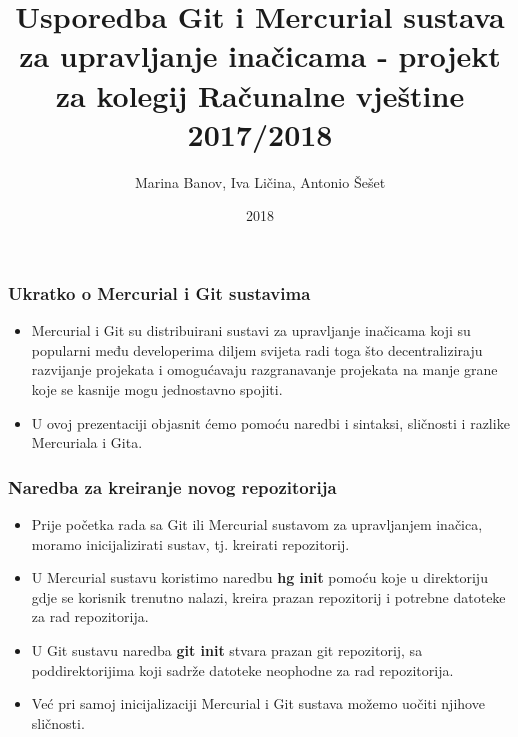 \documentclass{beamer}
\title{Usporedba Git i Mercurial sustava za upravljanje inačicama - projekt za kolegij Računalne vještine 2017/2018}
\author{Marina Banov, Iva Ličina, Antonio Šešet}
\institute{Tehnički fakultet u Rijeci}
\date{2018}
\begin{document}
 
	\frame{\titlepage}
 
	\begin{frame}
		\frametitle{Ukratko o Mercurial i Git sustavima}
		 \begin{itemize}
			\item Mercurial i Git su distribuirani sustavi za upravljanje inačicama koji su popularni među developerima diljem svijeta radi toga što decentraliziraju razvijanje projekata i omogućavaju razgranavanje projekata na manje grane koje se kasnije mogu jednostavno spojiti.
			\item U ovoj prezentaciji objasnit ćemo pomoću naredbi i sintaksi, sličnosti i razlike Mercuriala i Gita.
		\end{itemize}
	\end{frame}

	\begin{frame}
		\frametitle{Naredba za kreiranje novog  repozitorija}
		\begin{itemize}
			\item Prije početka rada sa Git ili Mercurial sustavom za upravljanjem inačica, moramo inicijalizirati sustav, tj. kreirati repozitorij.		
			\item U Mercurial sustavu koristimo naredbu \textbf{hg init} pomoću koje u direktoriju gdje se korisnik trenutno nalazi, kreira prazan repozitorij i  potrebne datoteke za rad repozitorija. 
			\item U Git sustavu naredba \textbf{git init} stvara prazan git repozitorij, sa poddirektorijima koji sadrže datoteke neophodne za rad repozitorija.
			\item Već pri samoj inicijalizaciji Mercurial i Git sustava možemo uočiti njihove sličnosti.
		\end{itemize}
	\end{frame}
\end{document}
